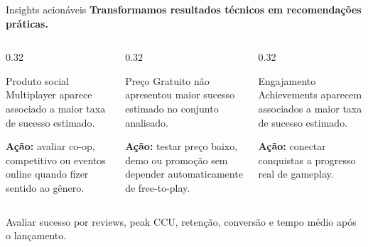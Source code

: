 \documentclass[aspectratio=169]{beamer}
\begin{document}
\begin{frame}{Insights acionáveis}
\scriptsize
\centering
\textbf{Transformamos resultados técnicos em recomendações práticas.}

\vspace{0.12cm}

\begin{columns}[T,onlytextwidth]
  \begin{column}{0.32\textwidth}
    \begin{block}{Produto social}
      Multiplayer aparece associado a maior taxa de sucesso estimado.

      \vspace{0.05cm}
      \textbf{Ação:} avaliar co-op, competitivo ou eventos online quando fizer sentido ao gênero.
    \end{block}
  \end{column}

  \begin{column}{0.32\textwidth}
    \begin{block}{Preço}
      Gratuito não apresentou maior sucesso estimado no conjunto analisado.

      \vspace{0.05cm}
      \textbf{Ação:} testar preço baixo, demo ou promoção sem depender automaticamente de free-to-play.
    \end{block}
  \end{column}

  \begin{column}{0.32\textwidth}
    \begin{block}{Engajamento}
      Achievements aparecem associados a maior taxa de sucesso estimado.

      \vspace{0.05cm}
      \textbf{Ação:} conectar conquistas a progresso real de gameplay.
    \end{block}
  \end{column}
\end{columns}

\vspace{0.12cm}
\footnotesize
Avaliar sucesso por reviews, peak CCU, retenção, conversão e tempo médio após o lançamento.
\end{frame}
\end{document}
